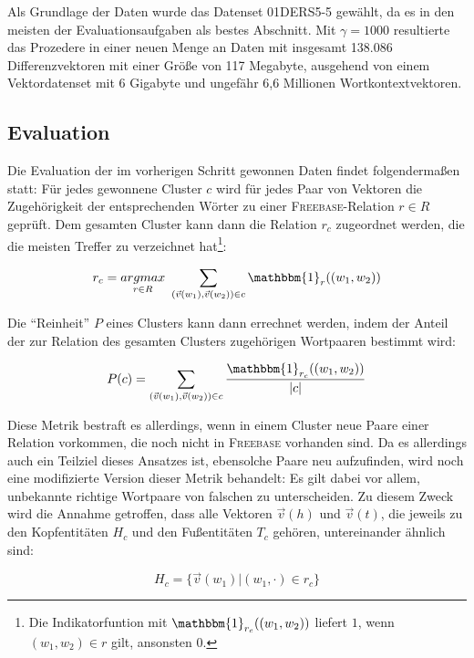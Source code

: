 Als Grundlage der Daten wurde das Datenset 01DERS5-5 gewählt, da es in den meisten der Evaluationsaufgaben
als bestes Abschnitt. Mit $\gamma = 1000$ resultierte das Prozedere in einer neuen Menge an Daten mit insgesamt
138.086 Differenzvektoren mit einer Größe von 117 Megabyte, ausgehend von einem Vektordatenset mit 6 Gigabyte und
ungefähr 6,6 Millionen Wortkontextvektoren.\\

\subsection{Evaluation}

Die Evaluation der im vorherigen Schritt gewonnen Daten findet folgendermaßen statt: Für jedes gewonnene Cluster $c$ wird für
jedes Paar von Vektoren die Zugehörigkeit der entsprechenden Wörter zu einer \textsc{Freebase}-Relation $r \in R$ geprüft.
Dem gesamten Cluster kann dann die Relation $r_c$ zugeordnet werden, die die meisten Treffer zu verzeichnet hat\footnote{Die Indikatorfuntion mit $\mathbbm{1}_{r_c}((w_1, w_2))$ liefert $1$, wenn
$(w_1, w_2) \in r$ gilt, ansonsten $0$.}:

\begin{equation}
    r_c = \underset{r \in R}{argmax}\ \sum_{(\vec{v}(w_1), \vec{v}(w_2)) \in c}  \mathbbm{1}_{r}((w_1, w_2))
\end{equation}

Die ``Reinheit'' $P$ eines Clusters kann dann errechnet werden, indem der Anteil der zur Relation des gesamten Clusters
zugehörigen Wortpaaren bestimmt wird:

\begin{equation}\label{form:purity}
    P(c) = \sum_{(\vec{v}(w_1), \vec{v}(w_2)) \in c} \frac{\mathbbm{1}_{r_c}((w_1, w_2))}{|c|}
\end{equation}

Diese Metrik bestraft es allerdings, wenn in einem Cluster neue Paare einer Relation vorkommen, die noch nicht in \textsc{Freebase}
vorhanden sind. Da es allerdings auch ein Teilziel dieses Ansatzes ist, ebensolche Paare neu aufzufinden, wird noch
eine modifizierte Version dieser Metrik behandelt: Es gilt dabei vor allem, unbekannte richtige Wortpaare von falschen
zu unterscheiden. Zu diesem Zweck wird die Annahme getroffen, dass alle Vektoren $\vec{v}(h)$ und $\vec{v}(t)$, die jeweils zu den Kopfentitäten $H_c$ und
den Fußentitäten $T_c$ gehören,
untereinander ähnlich sind:

\begin{equation}
H_c = \{\vec{v}(w_1)|(w_1, \cdot) \in r_c\}
\end{equation}

